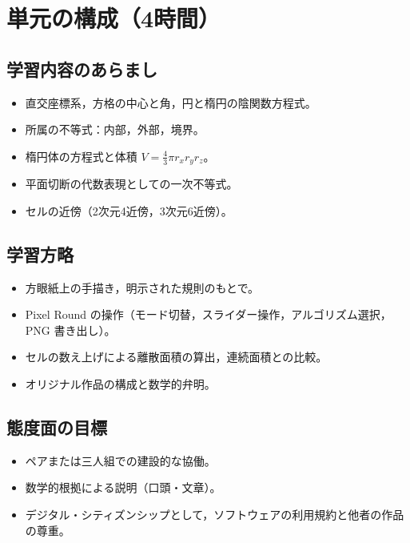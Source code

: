 \documentclass[12pt,a4paper]{scrartcl}
\begin{document}
\section{単元の構成（4時間）}

\subsection{学習内容のあらまし}
\begin{itemize}[leftmargin=1.3em,itemsep=0.15em,topsep=0.3em]
  \item 直交座標系，方格の中心と角，円と楕円の陰関数方程式。
  \item 所属の不等式：内部，外部，境界。
  \item 楕円体の方程式と体積 $V = \tfrac{4}{3}\pi r_x r_y r_z$。
  \item 平面切断の代数表現としての一次不等式。
  \item セルの近傍（2次元4近傍，3次元6近傍）。
\end{itemize}

\subsection{学習方略}
\begin{itemize}[leftmargin=1.3em,itemsep=0.15em,topsep=0.3em]
  \item 方眼紙上の手描き，明示された規則のもとで。
  \item Pixel Round の操作（モード切替，スライダー操作，アルゴリズム選択，PNG 書き出し）。
  \item セルの数え上げによる離散面積の算出，連続面積との比較。
  \item オリジナル作品の構成と数学的弁明。
\end{itemize}

\subsection{態度面の目標}
\begin{itemize}[leftmargin=1.3em,itemsep=0.15em,topsep=0.3em]
  \item ペアまたは三人組での建設的な協働。
  \item 数学的根拠による説明（口頭・文章）。
  \item デジタル・シティズンシップとして，ソフトウェアの利用規約と他者の作品の尊重。
\end{itemize}
\end{document}
